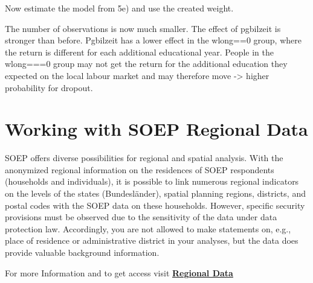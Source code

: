 \documentclass[letterpaper,10pt,openany,onesideH,english]{sphinxmanual}
\begin{document}
Now estimate the model from 5e) and use the created weight.

%
\begin{sphinxVerbatim}[commandchars=\\\{\},numbers=left,firstnumber=1,stepnumber=1]
   
\end{sphinxVerbatim}

\begin{figure}[H]
\centering

\noindent{}
\end{figure}

The number of observations is now much smaller. The effect of pgbilzeit is stronger than before. Pgbilzeit has a lower effect in the wlong==0 group, where the return is different for each additional educational year.  People in the wlong===0 group may not get the return for the additional education they expected on the local labour market and may therefore move -\textgreater{} higher probability for dropout.


\section{Working with SOEP Regional Data}
\label{\detokenize{Working with SOEP Data/index:working-with-soep-regional-data}}
SOEP offers diverse possibilities for regional and spatial analysis. With the anonymized regional information on the residences of SOEP respondents (households and individuals), it is possible to link numerous regional indicators on the levels of the states (Bundesländer), spatial planning regions, districts, and postal codes with the SOEP data on these households. However, specific security provisions must be observed due to the sensitivity of the data under data protection law. Accordingly, you are not allowed to make statements on, e.g., place of residence or administrative district in your analyses, but the data does provide valuable background information.

\begin{figure}[H]
\centering

\noindent{}
\end{figure}

For more Information and to get access visit  \href{https://www.diw.de/en/diw_02.c.222520.en/regional_data.html}{\textbf{Regional Data}}
\end{document}
